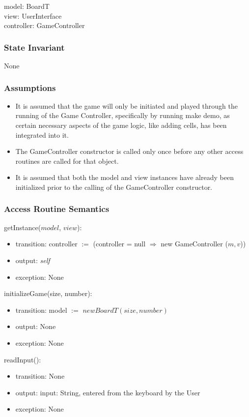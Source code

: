 \documentclass[12pt]{article}
\begin{document}
model: BoardT \\
view: UserInterface \\
controller: GameController

\subsubsection* {State Invariant}

None

\subsubsection* {Assumptions}

\begin{itemize}
  \item It is assumed that the game will only be initiated and played through the running of the Game Controller, specifically by running make demo, as certain necessary aspects of the game logic, like adding cells, has been integrated into it.
  \item The GameController constructor is called only once before any other access routines are called for that object.
  \item It is assumed that both the model and view instances have already been initialized prior to the calling of the GameController constructor.
\end{itemize}

\subsubsection* {Access Routine Semantics}

getInstance($model$, $view$):
\begin{itemize}
  \item transition: controller $:=$ (controller = null $\Rightarrow$ new GameController ($m, v$))
  \item output: \textit{self}
  \item exception: None
\end{itemize}

\noindent initializeGame(size, number):
\begin{itemize}
  \item transition: model $:=$ $new BoardT(size, number)$
  \item output: None
  \item exception: None
\end{itemize}

\noindent readInput():
\begin{itemize}
  \item transition: None
  \item output: input:  String, entered from the keyboard by the User
  \item exception: None
\end{itemize}
\end{document}
